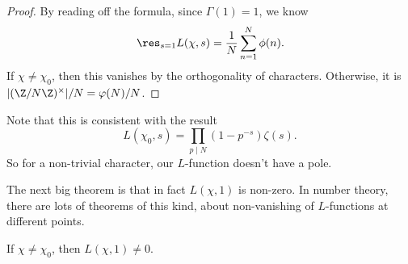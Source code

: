 \documentclass[a4paper]{article}
\begin{document}
\begin{proof}
  By reading off the formula, since $\Gamma(1) = 1$, we know
  \[
    \res_{s = 1} L(\chi, s) = \frac{1}{N}\sum_{n = 1}^N \phi(n).
  \]
  If $\chi \not= \chi_0$, then this vanishes by the orthogonality of characters. Otherwise, it is $|(\Z/N\Z)^\times|/N = \varphi(N)/N$.
\end{proof}
Note that this is consistent with the result
\[
  L(\chi_0, s) = \prod_{p \mid N} (1 - p^{-s}) \zeta(s).
\]
So for a non-trivial character, our $L$-function doesn't have a pole.

The next big theorem is that in fact $L(\chi, 1)$ is non-zero. In number theory, there are lots of theorems of this kind, about non-vanishing of $L$-functions at different points.
\begin{thm}
  If $\chi \not= \chi_0$, then $L(\chi, 1) \not= 0$.
\end{thm}
\end{document}
